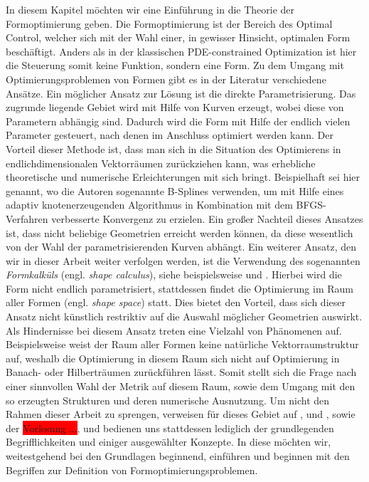 In diesem Kapitel möchten wir eine Einführung in die Theorie der Formoptimierung geben.
Die Formoptimierung ist der Bereich des Optimal Control, welcher sich mit der Wahl einer, in gewisser Hinsicht, optimalen Form beschäftigt. Anders als in der klassischen PDE-constrained Optimization ist hier die Steuerung somit keine Funktion, sondern eine Form.
Zu dem Umgang mit Optimierungsproblemen von Formen gibt es in der Literatur verschiedene Ansätze. \newline
Ein möglicher Ansatz zur Lösung ist die direkte Parametrisierung. Das zugrunde liegende Gebiet wird mit Hilfe von Kurven erzeugt, wobei diese von Parametern abhängig sind. Dadurch wird die Form mit Hilfe der endlich vielen Parameter gesteuert, nach denen im Anschluss optimiert werden kann. Der Vorteil dieser Methode ist, dass man sich in die Situation des Optimierens in endlichdimensionalen Vektorräumen zurückziehen kann, was erhebliche theoretische und numerische Erleichterungen mit sich bringt. Beispielhaft sei hier \cite{b-spline} genannt, wo die Autoren sogenannte B-Splines verwenden, um mit Hilfe eines adaptiv knotenerzeugenden Algorithmus in Kombination mit dem BFGS-Verfahren verbesserte Konvergenz zu erzielen. Ein großer Nachteil dieses Ansatzes ist, dass nicht beliebige Geometrien erreicht werden können, da diese wesentlich von der Wahl der parametrisierenden Kurven abhängt. \newline
Ein weiterer Ansatz, den wir in dieser Arbeit weiter verfolgen werden, ist die Verwendung des sogenannten \textit{Formkalküls} (engl. \textit{shape calculus}), siehe beispielsweise \cite{Shape_diff} und \cite{shapeopt}. Hierbei wird die Form nicht endlich parametrisiert, stattdessen findet die Optimierung im Raum aller Formen (engl. \textit{shape space}) statt. Dies bietet den Vorteil, dass sich dieser Ansatz nicht künstlich restriktiv auf die Auswahl möglicher Geometrien auswirkt. Als Hindernisse bei diesem Ansatz treten eine Vielzahl von Phänomenen auf. Beispielsweise weist der Raum aller Formen keine natürliche Vektorraumstruktur auf, weshalb die Optimierung in diesem Raum sich nicht auf Optimierung in Banach- oder Hilberträumen zurückführen lässt. Somit stellt sich die Frage nach einer sinnvollen Wahl der Metrik auf diesem Raum, sowie dem Umgang mit den so erzeugten Strukturen und deren numerische Ausnutzung.
Um nicht den Rahmen dieser Arbeit zu sprengen, verweisen für dieses Gebiet auf \cite{riemann}, \cite{riemann2} und \cite{shape_space}, sowie der  \colorbox{red}{Vorlesung ...}, und bedienen uns stattdessen lediglich der grundlegenden Begrifflichkeiten und einiger ausgewählter Konzepte. In diese möchten wir, weitestgehend bei den Grundlagen beginnend, einführen und beginnen mit den Begriffen zur Definition von Formoptimierungsproblemen.

